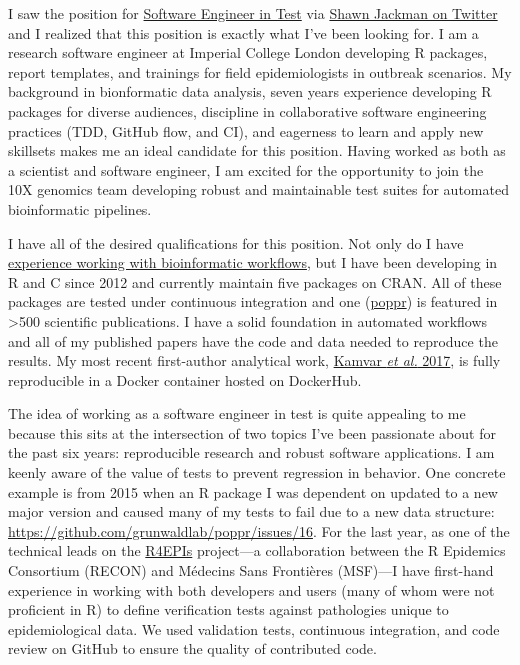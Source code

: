 I saw the position for
\href{https://boards.greenhouse.io/10xgenomics/jobs/1769868?gh_jid=1769868#application}{Software
Engineer in Test} via
\href{https://twitter.com/sjackman/status/1189977010908454912?s=20}{Shawn
Jackman on Twitter} and I realized that this position is exactly what I've been
looking for. I am a research software engineer at Imperial College London
developing R packages, report templates, and trainings for field
epidemiologists in outbreak scenarios. My background in bionformatic data
analysis, seven years experience developing R packages for diverse audiences,
discipline in collaborative software engineering practices (TDD, GitHub flow,
and CI), and eagerness to learn and apply new skillsets makes me an ideal
candidate for this position. Having worked as both as a scientist and software
engineer, I am excited for the opportunity to join the 10X genomics team
developing robust and maintainable test suites for automated bioinformatic
pipelines.

\vspace{1ex}

I have all of the desired qualifications for this position. Not only do I have
\href{https://github.com/zkamvar/read-processing}{experience working with 
bioinformatic workflows}, but I have been developing in R and C since 2012
and currently maintain five packages on CRAN. All of these packages are tested
under continuous integration and one
(\href{https://grunwaldlab.github.io/poppr}{poppr}) is featured in
\textgreater500 scientific publications. I have a solid foundation in automated
workflows and all of my published papers have the code and data needed to
reproduce the results. My most recent first-author analytical work,
\href{https://peerj.com/articles/4152/}{Kamvar \textit{et al.} 2017}, is fully
reproducible in a Docker container hosted on DockerHub.

\vspace{1ex}

The idea of working as a software engineer in test is quite appealing to me
because this sits at the intersection of two topics I've been passionate about
for the past six years: reproducible research and robust software applications.
I am keenly aware of the value of tests to prevent regression in behavior. One
concrete example is from 2015 when an R package I was dependent on updated to a
new major version and caused many of my tests to fail due to a new data
structure: \url{https://github.com/grunwaldlab/poppr/issues/16}. For the last
year, as one of the technical leads on the
\href{https://r4epis.netlify.com}{R4EPIs} project---a collaboration between the
R Epidemics Consortium (RECON) and M\'{e}decins Sans Fronti\`{e}res (MSF)---I
have first-hand experience in working with both developers and users (many of
whom were not proficient in R) to define verification tests against pathologies
unique to epidemiological data. We used validation tests, continuous
integration, and code review on GitHub to ensure the quality of contributed
code.

